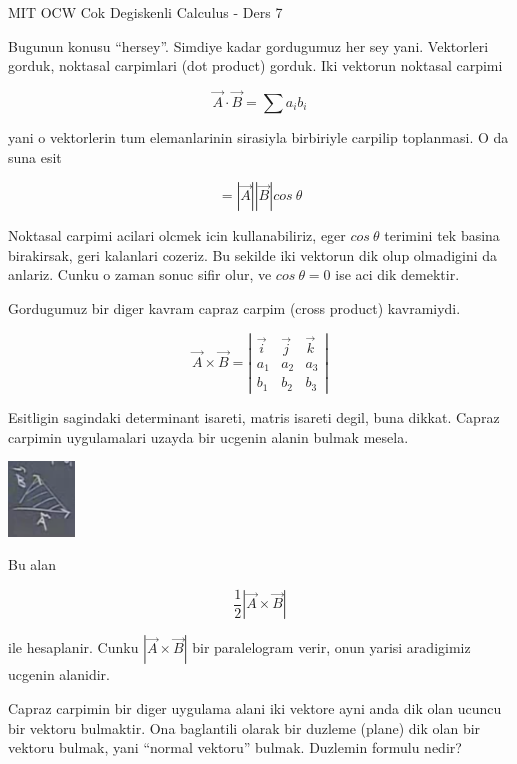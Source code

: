 \documentclass[12pt,fleqn]{article}
\begin{document}
MIT OCW Cok Degiskenli Calculus - Ders 7

Bugunun konusu ``hersey''. Simdiye kadar gordugumuz her sey
yani. Vektorleri gorduk, noktasal carpimlari (dot product) gorduk. Iki
vektorun noktasal carpimi

\[ \vec{A} \cdot \vec{B} = \sum a_ib_i\]

yani o vektorlerin tum elemanlarinin sirasiyla birbiriyle carpilip
toplanmasi. O da suna esit

\[ = |\vec{A}||\vec{B}|cos \ \theta \]

Noktasal carpimi acilari olcmek icin kullanabiliriz, eger $cos \ \theta$
terimini tek basina birakirsak, geri kalanlari cozeriz. Bu sekilde iki
vektorun dik olup olmadigini da anlariz. Cunku o zaman sonuc sifir olur, ve
$cos \ \theta = 0$ ise aci dik demektir. 

Gordugumuz bir diger kavram capraz carpim (cross product) kavramiydi. 

\[ \vec{A} \times \vec{B} = 
\left|\begin{array}{rrr}
\vec{i} & \vec{j} & \vec{k}  \\
a_1 & a_2 & a_3 \\
b_1 & b_2 & b_3 
\end{array}\right|
\]

Esitligin sagindaki determinant isareti, matris isareti degil, buna
dikkat. Capraz carpimin uygulamalari uzayda bir ucgenin alanin bulmak
mesela. 

\includegraphics[height=2cm]{7_1.png}

Bu alan

\[ \frac{1}{2}|\vec{A} \times \vec{B}| \]

ile hesaplanir. Cunku $|\vec{A} \times \vec{B}|$ bir paralelogram verir,
onun yarisi aradigimiz ucgenin alanidir.

Capraz carpimin bir diger uygulama alani iki vektore ayni anda dik olan
ucuncu bir vektoru bulmaktir. Ona baglantili olarak bir duzleme (plane) dik
olan bir vektoru bulmak, yani ``normal vektoru'' bulmak. Duzlemin formulu
nedir? 
\end{document}
